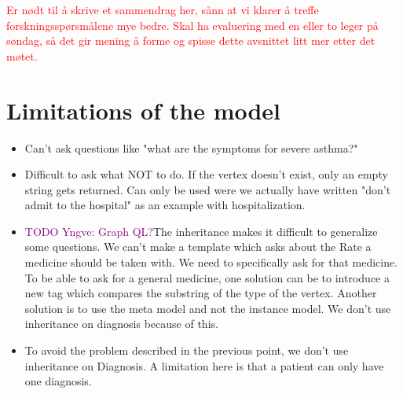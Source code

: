 \textcolor{red}{Er nødt til å skrive et sammendrag her, sånn at vi klarer å treffe forskningsspørsmålene mye bedre. Skal ha evaluering med en eller to leger på søndag, så det gir mening å forme og spisse dette avsnittet litt mer etter det møtet.}

\section{Limitations of the model}
\begin{itemize}
	\item Can't ask questions like "what are the symptoms for severe asthma?"
	\item Difficult to ask what NOT to do. If the vertex doesn't exist, only an empty string gets returned. Can only be used were we actually have written "don't admit to the hospital" as an example with hospitalization.
	\item \textcolor{purple}{TODO Yngve: Graph QL?}The inheritance makes it difficult to generalize some questions. We can't make a template which asks about the Rate a medicine should be taken with. We need to specifically ask for that medicine. To be able to ask for a general medicine, one solution can be to introduce a new tag which compares the substring of the type of the vertex. Another solution is to use the meta model and not the instance model. We don't use inheritance on diagnosis because of this.
	\item To avoid the problem described in the previous point, we don't use inheritance on Diagnosis. A limitation here is that  
	a patient can only have one diagnosis.
\end{itemize}
	

